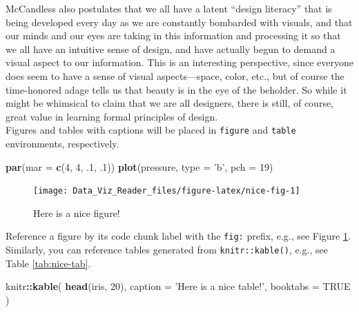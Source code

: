 \documentclass[]{book}
\newenvironment{Shaded}{\begin{snugshade}}{\end{snugshade}}
\newcommand{\KeywordTok}[1]{\textcolor[rgb]{0.13,0.29,0.53}{\textbf{#1}}}
\newcommand{\DataTypeTok}[1]{\textcolor[rgb]{0.13,0.29,0.53}{#1}}
\newcommand{\DecValTok}[1]{\textcolor[rgb]{0.00,0.00,0.81}{#1}}
\newcommand{\StringTok}[1]{\textcolor[rgb]{0.31,0.60,0.02}{#1}}
\newcommand{\OtherTok}[1]{\textcolor[rgb]{0.56,0.35,0.01}{#1}}
\newcommand{\OperatorTok}[1]{\textcolor[rgb]{0.81,0.36,0.00}{\textbf{#1}}}
\newcommand{\NormalTok}[1]{#1}
\theoremstyle{definition}
\theoremstyle{definition}
\theoremstyle{definition}
\theoremstyle{remark}
\begin{document}
McCandless also postulates that we all have a latent ``design literacy''
that is being developed every day as we are constantly bombarded with
visuals, and that our minds and our eyes are taking in this information
and processing it so that we all have an intuitive sense of design, and
have actually begun to demand a visual aspect to our information. This
is an interesting perspective, since everyone does seem to have a sense
of visual aspects---space, color, etc., but of course the time-honored
adage tells us that beauty is in the eye of the beholder. So while it
might be whimsical to claim that we are all designers, there is still,
of course, great value in learning formal principles of design.\\
Figures and tables with captions will be placed in \texttt{figure} and
\texttt{table} environments, respectively.

\begin{Shaded}
\begin{Highlighting}[]
\KeywordTok{par}\NormalTok{(}\DataTypeTok{mar =} \KeywordTok{c}\NormalTok{(}\DecValTok{4}\NormalTok{, }\DecValTok{4}\NormalTok{, .}\DecValTok{1}\NormalTok{, .}\DecValTok{1}\NormalTok{))}
\KeywordTok{plot}\NormalTok{(pressure, }\DataTypeTok{type =} \StringTok{'b'}\NormalTok{, }\DataTypeTok{pch =} \DecValTok{19}\NormalTok{)}
\end{Highlighting}
\end{Shaded}

\begin{figure}

{\centering \texttt{[image: Data\_Viz\_Reader\_files/figure-latex/nice-fig-1]} 

}

\caption{Here is a nice figure!}\label{fig:nice-fig}
\end{figure}

Reference a figure by its code chunk label with the \texttt{fig:}
prefix, e.g., see Figure \ref{fig:nice-fig}. Similarly, you can
reference tables generated from \texttt{knitr::kable()}, e.g., see Table
\ref{tab:nice-tab}.

\begin{Shaded}
\begin{Highlighting}[]
\NormalTok{knitr}\OperatorTok{::}\KeywordTok{kable}\NormalTok{(}
  \KeywordTok{head}\NormalTok{(iris, }\DecValTok{20}\NormalTok{), }\DataTypeTok{caption =} \StringTok{'Here is a nice table!'}\NormalTok{,}
  \DataTypeTok{booktabs =} \OtherTok{TRUE}
\NormalTok{)}
\end{Highlighting}
\end{Shaded}
\end{document}
